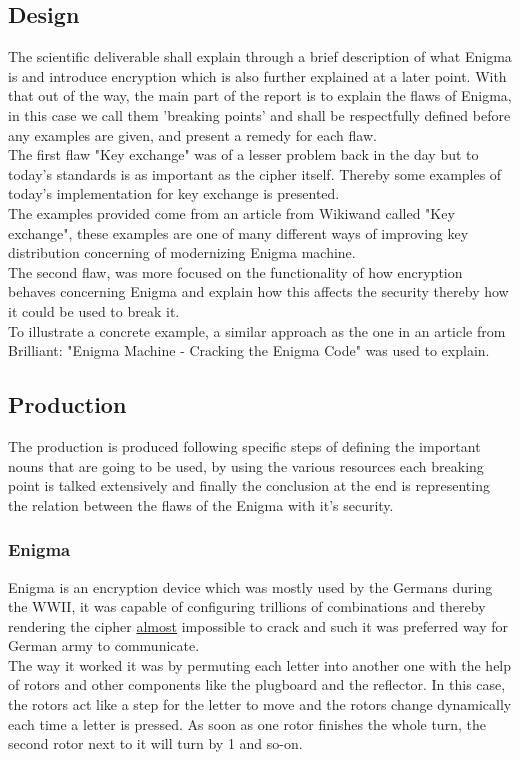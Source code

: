 \documentclass[conference,compsoc]{IEEEtran}
\begin{document}
\subsection{Design}
The scientific deliverable shall explain through a brief description of what Enigma is and introduce encryption which is also further explained at a later point. With that out of the way, the main part of the report is to explain the flaws of Enigma, in this case we call them 'breaking points' and shall be respectfully defined before any examples are given, and present a remedy for each flaw.\\

The first flaw "Key exchange" was of a lesser problem back in the day but to today's standards is as important as the cipher itself. Thereby some examples of today's implementation for key exchange is presented.\\
The examples provided come from an article from Wikiwand called "Key exchange", these examples are one of many different ways of improving key distribution concerning of modernizing Enigma machine.\\ 

The second flaw, was more focused on the functionality of how encryption behaves concerning Enigma and explain how this affects the security thereby how it could be used to break it.\\
To illustrate a concrete example, a similar approach as the one in an article from Brilliant: "Enigma Machine - Cracking the Enigma Code" was used to explain.\\

\subsection{Production}

The production is produced following specific steps of defining the important nouns that are going to be used, by using the various resources each breaking point is talked extensively and finally the conclusion at the end is representing the relation between the flaws of the Enigma with it's security.\\  

\subsubsection{Enigma} Enigma is an encryption device which was mostly used by the Germans during the WWII, it was capable of configuring trillions of combinations and thereby rendering the cipher \underline{almost} impossible to crack and such it was preferred way for German army to communicate.\\
The way it worked it was by permuting each letter into another one with the help of rotors and other components like the plugboard and the reflector. In this case, the rotors act like a step for the letter to move and the rotors change dynamically each time a letter is pressed. As soon as one rotor finishes the whole turn, the second rotor next to it will turn by 1 and so-on.\\
\end{document}
